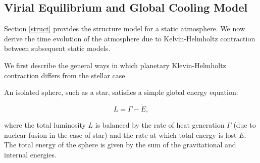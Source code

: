 \documentclass[apj]{emulateapj}
\begin{document}



\subsection{Virial Equilibrium and Global Cooling Model}
\label{cooling}

Section \ref{struct} provides the structure model for a static atmosphere. We now derive the time evolution of the atmosphere due to Kelvin-Helmholtz contraction between subsequent static models. 

We first describe the general ways in which planetary Klevin-Helmholtz contraction differs from the stellar case.

An isolated sphere, such as a star, satisfies a simple global energy equation:

\begin{equation}
\label{eq:coolingstar}
L=\Gamma - \dot{E},
\end{equation}

\noindent where the total luminosity $L$ is balanced by the rate of heat generation $\Gamma$ (due to nuclear fusion in the case of star) and the rate at which total energy is lost $\dot{E}$. The total energy of the sphere is given by the sum of the gravitational and internal energies. 
\end{document}
